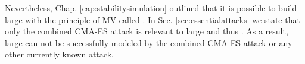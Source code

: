 Nevertheless, Chap. \ref{cap:stabilitysimulation} outlined that it is possible to build large \xpufs with the principle of \ac{MV} called \mxpufs.
In Sec. \ref{sec:essentialattacks} we state that only the combined \ac{CMA-ES} attack is relevant to large \xpufs and thus \mxpufs.
As a result, large \mxpufs can not be successfully modeled by the combined \ac{CMA-ES} attack or any other currently known attack.


